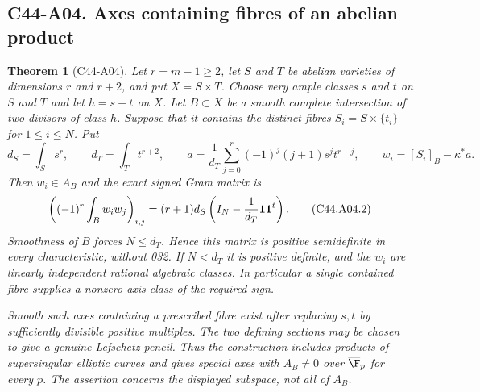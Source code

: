 \documentclass[11pt]{article}
\newtheorem{theorem}{Theorem}[section]
\theoremstyle{remark}\newtheorem{remark}[theorem]{Remark}
\begin{document}
\subsection*{C44-A04. Axes containing fibres of an abelian product}
\begin{theorem}[C44-A04]\label{thm:product-axis}
Let $r=m-1\ge2$, let $S$ and $T$ be abelian varieties of dimensions
$r$ and $r+2$, and put $X=S\times T$. Choose very ample classes
$s$ and $t$ on $S$ and $T$ and let $h=s+t$ on $X$. Let
$B\subset X$ be a smooth complete intersection of two divisors of
class $h$. Suppose that it contains the distinct fibres
$S_i=S\times\{t_i\}$ for $1\le i\le N$. Put
\[
 d_S=\int_Ss^r,\qquad d_T=\int_Tt^{r+2},\qquad
 a=\frac1{d_T}\sum_{j=0}^r(-1)^j(j+1)s^jt^{r-j},
 \qquad w_i=[S_i]_B-\kappa^*a.
 \tag{C44.A04.1}
\]
Then $w_i\in A_B$ and the exact signed Gram matrix is
\[
 \left((-1)^r\int_B w_iw_j\right)_{i,j}
       =(r+1)d_S\left(I_N-\frac1{d_T}{\bf1}{\bf1}^{t}\right).
 \tag{C44.A04.2}
\]
Smoothness of $B$ forces $N\le d_T$. Hence this matrix is positive
semidefinite in every characteristic, without 032. If $N<d_T$ it is
positive definite, and the $w_i$ are linearly independent rational
algebraic classes. In particular a single contained fibre supplies a
nonzero axis class of the required sign.

Smooth such axes containing a prescribed fibre exist after replacing
$s,t$ by sufficiently divisible positive multiples. The two defining
sections may be chosen to give a genuine Lefschetz pencil. Thus the
construction includes products of supersingular elliptic curves and
gives special axes with $A_B\ne0$ over $\overline{\F}_p$ for every $p$.
The assertion concerns the displayed subspace, not all of $A_B$.
\end{theorem}
\end{document}
